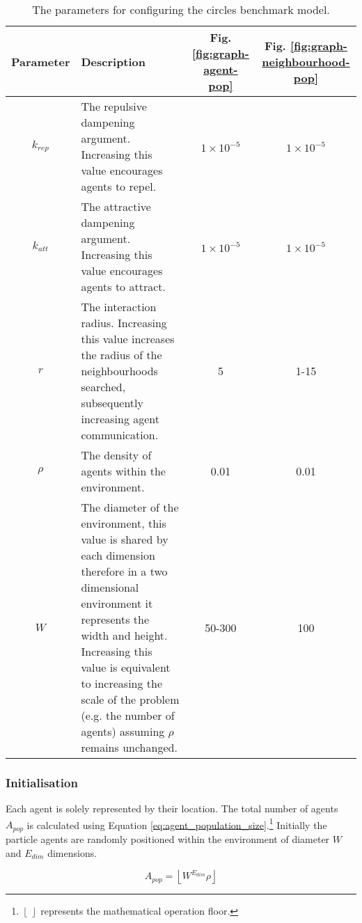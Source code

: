     \begin{table}
      \begin{tabu}{ |c|>{\raggedright}X|c|c| }
        \hline
        \textbf{Parameter} & \textbf{Description} & Fig. \ref{fig:graph-agent-pop} & Fig. \ref{fig:graph-neighbourhood-pop} \\ \hline
        $k_{rep}$ & The repulsive dampening argument. Increasing this value encourages agents to repel. & $1\times10^{-5}$ & $1\times10^{-5}$ \\ \hline
        $k_{att}$ & The attractive dampening argument. Increasing this value encourages agents to attract. & $1\times10^{-5}$ & $1\times10^{-5}$ \\ \hline
        $r$ & The interaction radius. Increasing this value increases the radius of the neighbourhoods searched, subsequently increasing agent communication. & 5 & 1-15 \\ \hline
        $ \rho $ & The density of agents within the environment. & 0.01 & 0.01 \\ \hline
        $W$ & The diameter of the environment, this value is shared by each dimension therefore in a two dimensional environment it represents the width and height. Increasing this value is equivalent to increasing the scale of the problem (e.g. the number of agents) assuming $ \rho $ remains unchanged. & 50-300 & 100\\ \hline
      \end{tabu}
      \caption{\label{tab:benchmark-parameters}The parameters for configuring the circles benchmark model.}
    \vspace{-1cm}
    \end{table}    
    
    \subsubsection{Initialisation}
      Each agent is solely represented by their location. The total number of agents $A_{pop}$ is calculated using Equation \ref{eq:agent_population_size}.\footnote{$\left\lfloor\:\right\rfloor$ represents the mathematical operation floor.} Initially the particle agents are randomly positioned within the environment of diameter $W$ and $E_{dim}$ dimensions.      
      
      \begin{equation}\label{eq:agent_population_size}
        A_{pop} = \left\lfloor{W^{E_{dim}} \rho}\right\rfloor
      \end{equation}
    
